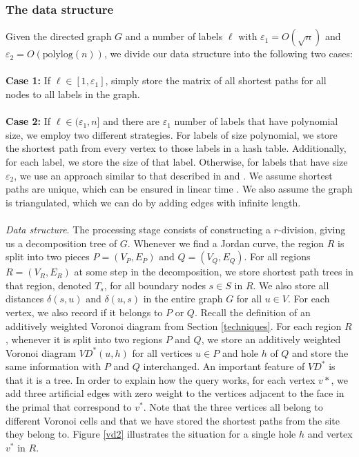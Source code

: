 \subsubsection{The data structure}
Given the directed graph $G$ and a number of labels $\ell$ with
$\varepsilon_1 = O(\sqrt{n})$ and $\varepsilon_2=O(\text{polylog}(n))$, we divide our
data structure into the following two cases: \\
\\
\textbf{Case 1:} If $\ell\in [1, \varepsilon_1]$, simply store the matrix of all shortest paths for all nodes to all
labels in the graph. \\
\\
\textbf{Case 2:} If $\ell\in (\varepsilon_1, n]$ and there are $\varepsilon_1$ number of labels that have
polynomial size, we employ two different strategies. For labels of size polynomial, we store the
shortest path from every vertex to those labels in a hash table. Additionally, for each
label, we store the size of that label. Otherwise, for labels that have size
$\varepsilon_2$, we
use an approach similar to that described in \cite{cohen2017fast} and
\cite{gawrychowski2017better}. We assume shortest paths are unique, which can be ensured
in linear time \cite{motwani2010randomized}\cite{mulmuley1987matching}. We also assume
the graph is triangulated, which we can do by adding edges with infinite length.\\
\\
\indent
\textit{Data structure}. The processing stage consists of constructing a $r$-division,
giving us a decomposition tree of $G$. Whenever we find a Jordan curve, the region $R$ is
split into two pieces $P=(V_P, E_P)$ and
$Q=(V_Q, E_Q)$. For all regions $R=(V_R, E_R)$ at some
step in the decomposition, we store shortest path trees in that region, denoted $T_s$,
for all boundary nodes $s\in S$ in $R$. We also store all distances $\delta(s,u)$ and
$\delta(u,s)$ in the entire graph $G$ for all $u\in V$. For each vertex, we also record
if it belongs to $P$ or $Q$. Recall the definition of an
additively weighted Voronoi diagram from Section \ref{techniques}. For each region $R$,
whenever it is split into two regions $P$ and $Q$, we store an additively weighted
Voronoi diagram $VD^*(u,h)$ for all vertices $u\in P$ and hole $h$ of $Q$ and store the
same information with $P$ and $Q$ interchanged. An important feature of $VD^*$ is that it is a tree. In order to explain how the
query works, for each vertex $v*$, we add three artificial edges with zero weight to the vertices adjacent
to the face in the primal that correspond to $v^*$. Note that the three vertices all
belong to different Voronoi cells and that we have stored the shortest paths from the site they
belong to. Figure \ref{vd2} illustrates the
situation for a single hole $h$ and vertex $v^*$ in $R$.

